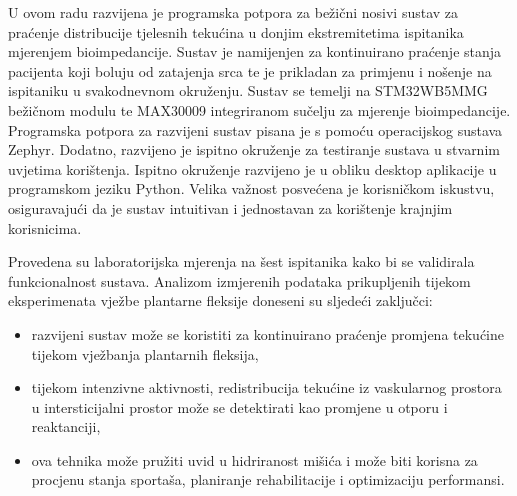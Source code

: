 \documentclass[../diplomski_rad.tex]{subfiles}
\begin{document}
\sloppy

\justifying

U ovom radu razvijena je programska potpora za bežični nosivi sustav za praćenje distribucije tjelesnih tekućina u donjim ekstremitetima
ispitanika mjerenjem bioimpedancije. 
Sustav je namijenjen za kontinuirano praćenje stanja pacijenta koji boluju od zatajenja srca te je prikladan 
za primjenu i nošenje na ispitaniku u svakodnevnom okruženju. 
Sustav se temelji na STM32WB5MMG bežičnom modulu te MAX30009 integriranom sučelju za mjerenje bioimpedancije. 
Programska potpora za razvijeni sustav pisana je s pomoću operacijskog sustava Zephyr.  
Dodatno, razvijeno je ispitno okruženje
za testiranje sustava u stvarnim uvjetima korištenja. 
Ispitno okruženje razvijeno je u obliku desktop aplikacije u programskom jeziku Python.
Velika važnost posvećena je korisničkom iskustvu, osiguravajući da je sustav intuitivan i 
jednostavan za korištenje krajnjim korisnicima.

Provedena su laboratorijska mjerenja na šest ispitanika kako bi se validirala funkcionalnost sustava. 
Analizom izmjerenih podataka prikupljenih tijekom eksperimenata vježbe plantarne fleksije doneseni su sljedeći zaključci: 
\begin{itemize}
    \item razvijeni sustav može se koristiti za kontinuirano praćenje promjena tekućine tijekom vježbanja plantarnih fleksija,  
    \item tijekom intenzivne aktivnosti, redistribucija tekućine iz vaskularnog prostora u intersticijalni prostor 
    može se detektirati kao promjene u otporu i reaktanciji,
    \item ova tehnika može pružiti uvid u hidriranost mišića i može biti korisna za procjenu stanja sportaša, 
    planiranje rehabilitacije i optimizaciju performansi. 
\end{itemize} 
\end{document}
